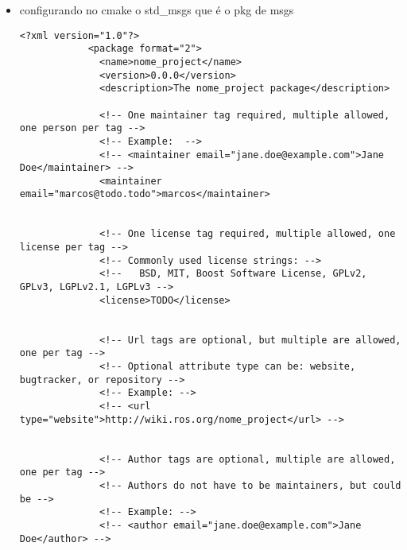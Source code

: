 \documentclass[letterpaper]{article}
\begin{document}
\begin{itemize}
\begin{lstlisting}[style=mystyle, title=src/nome\_project/CMakeLists.txt]
        \end{lstlisting}
        \begin{lstlisting}[style=mystyle, title=]
        find_package(catkin REQUIRED COMPONENTS
          roscpp
          std_msgs
          my_project_msg
        )
        \end{lstlisting}
        \item configurando no cmake o std\_msgs que é o pkg de msgs
        \begin{lstlisting}[style=bashstyle, title=src/nome_project/package.xml] 
        <?xml version="1.0"?>
            <package format="2">
              <name>nome_project</name>
              <version>0.0.0</version>
              <description>The nome_project package</description>
            
              <!-- One maintainer tag required, multiple allowed, one person per tag -->
              <!-- Example:  -->
              <!-- <maintainer email="jane.doe@example.com">Jane Doe</maintainer> -->
              <maintainer email="marcos@todo.todo">marcos</maintainer>
            
            
              <!-- One license tag required, multiple allowed, one license per tag -->
              <!-- Commonly used license strings: -->
              <!--   BSD, MIT, Boost Software License, GPLv2, GPLv3, LGPLv2.1, LGPLv3 -->
              <license>TODO</license>
            
            
              <!-- Url tags are optional, but multiple are allowed, one per tag -->
              <!-- Optional attribute type can be: website, bugtracker, or repository -->
              <!-- Example: -->
              <!-- <url type="website">http://wiki.ros.org/nome_project</url> -->
            
            
              <!-- Author tags are optional, multiple are allowed, one per tag -->
              <!-- Authors do not have to be maintainers, but could be -->
              <!-- Example: -->
              <!-- <author email="jane.doe@example.com">Jane Doe</author> -->
            

\end{lstlisting}
\end{itemize}
\end{document}
